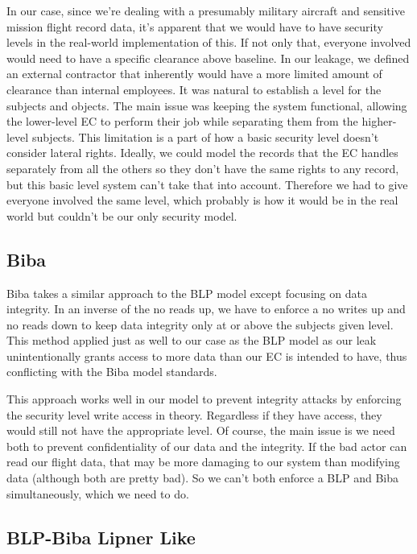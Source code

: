 \documentclass[10pt,journal,compsoc]{IEEEtran}
\begin{document}
In our case, since we're dealing with a presumably military aircraft and sensitive mission flight record data, it's apparent that we would have to have security levels in the real-world implementation of this. If not only that, everyone involved would need to have a specific clearance above baseline. In our leakage, we defined an external contractor that inherently would have a more limited amount of clearance than internal employees. It was natural to establish a level for the subjects and objects. The main issue was keeping the system functional, allowing the lower-level EC to perform their job while separating them from the higher-level subjects. This limitation is a part of how a basic security level doesn't consider lateral rights. Ideally, we could model the records that the EC handles separately from all the others so they don't have the same rights to any record, but this basic level system can't take that into account. Therefore we had to give everyone involved the same level, which probably is how it would be in the real world but couldn't be our only security model.

\subsection{Biba}

Biba takes a similar approach to the BLP model except focusing on data integrity. In an inverse of the no reads up, we have to enforce a no writes up and no reads down to keep data integrity only at or above the subjects given level. This method applied just as well to our case as the BLP model as our leak unintentionally grants access to more data than our EC is intended to have, thus conflicting with the Biba model standards. 

This approach works well in our model to prevent integrity attacks by enforcing the security level write access in theory. Regardless if they have access, they would still not have the appropriate level. Of course, the main issue is we need both to prevent confidentiality of our data and the integrity. If the bad actor can read our flight data, that may be more damaging to our system than modifying data (although both are pretty bad). So we can't both enforce a BLP and Biba simultaneously, which we need to do. 

\subsection{BLP-Biba Lipner Like}
\end{document}
